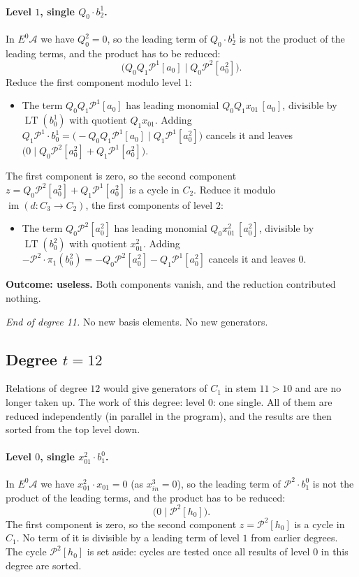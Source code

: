 \documentclass[11pt]{article}
\renewcommand{\P}{\mathcal{P}}
\newcommand{\A}{\mathcal{A}}
\DeclareMathOperator{\LT}{LT}
\begin{document}
\paragraph{Level $1$, single $Q_{0}\cdot b^{1}_{2}$.} In $E^0\A$ we have $Q_{0}^2 = 0$, so the leading term of $Q_{0}\cdot b^{1}_{2}$ is not the product of the leading terms, and the product has to be reduced:
\[\bigl(Q_{0}Q_{1}\P^{1}[a_0] \;\big|\; Q_{0}\P^{2}[a_0^2]\bigr).\]
Reduce the first component modulo level $1$:
\begin{itemize}
\item The term $Q_{0}Q_{1}\P^{1}[a_0]$ has leading monomial $Q_{0}Q_{1}x_{01}\,[a_0]$, divisible by $\LT(b^{1}_{0})$ with quotient $Q_{1}x_{01}$. Adding $Q_{1}\P^{1}\cdot b^{1}_{0} = \bigl(-Q_{0}Q_{1}\P^{1}[a_0] \;\big|\; Q_{1}\P^{1}[a_0^2]\bigr)$ cancels it and leaves $\bigl(0 \;\big|\; Q_{0}\P^{2}[a_0^2] + Q_{1}\P^{1}[a_0^2]\bigr)$.
\end{itemize}
The first component is zero, so the second component $z = Q_{0}\P^{2}[a_0^2] + Q_{1}\P^{1}[a_0^2]$ is a cycle in $C_{2}$.
Reduce it modulo $\operatorname{im}(d\colon C_{3}\to C_{2})$, the first components of level $2$:
\begin{itemize}
\item The term $Q_{0}\P^{2}[a_0^2]$ has leading monomial $Q_{0}x_{01}^{2}\,[a_0^2]$, divisible by $\LT(b^{2}_{0})$ with quotient $x_{01}^{2}$. Adding $-\P^{2}\cdot \pi_1(b^{2}_{0}) = -Q_{0}\P^{2}[a_0^2] - Q_{1}\P^{1}[a_0^2]$ cancels it and leaves $0$.
\end{itemize}
\textbf{Outcome: useless.} Both components vanish, and the reduction contributed nothing.
\medskip
\par\noindent\emph{End of degree 11.} No new basis elements. No new generators.
\subsection*{Degree $t = 12$}
\noindent Relations of degree $12$ would give generators of $C_1$ in stem $11 > 10$ and are no longer taken up.
\noindent The work of this degree: level $0$: one single. All of them are reduced independently (in parallel in the program), and the results are then sorted from the top level down.
\medskip
\paragraph{Level $0$, single $x_{01}^{2}\cdot b^{0}_{1}$.} In $E^0\A$ we have $x_{01}^{2}\cdot x_{01} = 0$ (as $x_{in}^{3} = 0$), so the leading term of $\P^{2}\cdot b^{0}_{1}$ is not the product of the leading terms, and the product has to be reduced:
\[\bigl(0 \;\big|\; \P^{2}[h_0]\bigr).\]
The first component is zero, so the second component $z = \P^{2}[h_0]$ is a cycle in $C_{1}$.
No term of it is divisible by a leading term of level $1$ from earlier degrees.
The cycle $\P^{2}[h_0]$ is set aside: cycles are tested once all results of level $0$ in this degree are sorted.
\medskip
\end{document}
